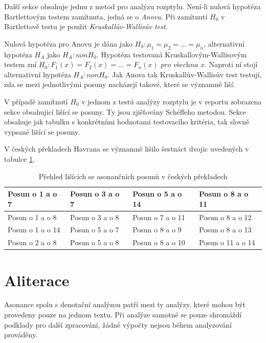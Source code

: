 \documentclass[dp.tex]{subfiles}
\begin{document}
Další sekce obsahuje jednu z metod pro analýzu rozptylu. Není-li nulová hypotéza Bartlettovým testem zamítnuta, jedná se o \textit{Anovu}. Při zamítnutí $H_0$ v Bartlettově testu je použit \textit{Kruskallův-Wallisův test}.

Nulová hypotéza pro Anovu je dána jako $H_0: \mu_1 = \mu_2 = \dots = \mu_n$, alternativní hypotéza $H_A$ jako $H_A: non H_0$. Hypotéza testovaná Kruskallovým-Wallisovým testem zní $H_0: F_1(x) = F_2(x) = \dots = F_n(x) \textit{ pro všechna x}$. Naproti ní stojí alternativní hypotéza $H_A: non H_0$. Jak Anova tak Kruskallův-Wallisův test testují, zda se mezi jednotlivými posuny nacházejí takové, které se významně liší.

V případě zamítnutí $H_0$ v jednom z testů analýzy rozptylu je v reportu zobrazena sekce obsahující lišící se posuny. Ty jsou zjišťovány Schéffeho metodou. Sekce obsahuje jak tabulku s konkrétními hodnotami testovacího kritéria, tak slovně vypsané lišící se posuny.

V českých překladech Havrana se významně lišilo šestnáct dvojic uvedených v tabulce \ref{tab:asonance-lisici-se}.
\begin {table}[H]
	\caption {Přehled lišících se asonančních posunů v českých překladech} 
	\label{tab:asonance-lisici-se} 

	\begin{center}
		\begin{tabular}{|l|l|l|l|}
		\hline Posun o 1 a o 7   & Posun o 3 a o 7 & Posun o 5 a o 14 & Posun o 8 a o 11  \\ 
		\hline Posun o 1 a o 8   & Posun o 3 a o 8 & Posun o 7 a o 11 & Posun o 8 a o 12  \\ 
		\hline Posun o 1 a o 14  & Posun o 5 a o 7 & Posun o 8 a o 9  & Posun o 8 a o 13  \\ 
		\hline Posun o 2 a o 8   & Posun o 5 a o 8 & Posun o 8 a o 10 & Posun o 11 a o 14 \\ 
		\hline 
		\end{tabular} 
	\end{center}
\end{table}

\section{Aliterace}

Asonance spolu s denotační analýzou patří mezi ty analýzy, které mohou být provedeny pouze na jednom textu. Při analýze samotné se pouze shromáždí podklady pro další zpracování, žádné výpočty nejsou během analyzování prováděny.
\end{document}
